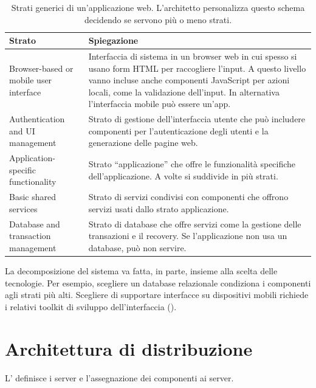 \begin{table}[!ht]
\centering
\small
\caption{Strati generici di un'applicazione web. L'architetto personalizza questo schema decidendo se servono più o
meno strati.}
\label{tab:arch-strati-web}
\begin{tabularx}{\linewidth}{>{\raggedright\arraybackslash}p{4cm}X}
\toprule
Strato & Spiegazione \\
\midrule
Browser-based or mobile user interface & Interfaccia di sistema in un browser web in cui spesso si usano form HTML per
  raccogliere l'input. A questo livello vanno incluse anche componenti JavaScript per azioni locali, come la
  validazione dell'input. In alternativa l'interfaccia mobile può essere un'app. \\
Authentication and UI management & Strato di gestione dell'interfaccia utente che può includere componenti per
  l'autenticazione degli utenti e la generazione delle pagine web. \\
Application-specific functionality & Strato ``applicazione'' che offre le funzionalità specifiche dell'applicazione.
  A volte si suddivide in più strati. \\
Basic shared services & Strato di servizi condivisi con componenti che offrono servizi usati dallo strato
  applicazione. \\
Database and transaction management & Strato di database che offre servizi come la gestione delle transazioni e il
  recovery. Se l'applicazione non usa un database, può non servire. \\
\bottomrule
\end{tabularx}
\end{table}

\begin{attenzione}
La decomposizione del sistema va fatta, in parte, insieme alla scelta delle tecnologie. Per esempio, scegliere un
database relazionale condiziona i componenti agli strati più alti. Scegliere di supportare interfacce su dispositivi
mobili richiede i relativi toolkit di sviluppo dell'interfaccia ().
\end{attenzione}

\section{Architettura di distribuzione}
\label{sec:arch-distribuzione}

L' definisce i server e l'assegnazione dei componenti ai server.

